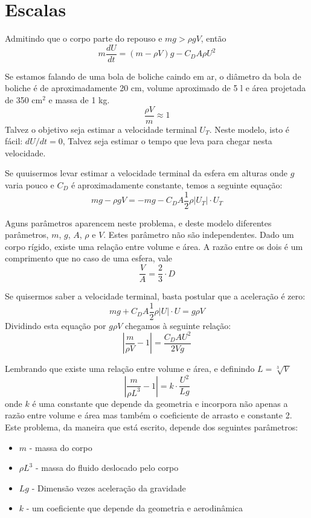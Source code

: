 \section{Escalas}

Admitindo que o corpo parte do repouso e $mg > \rho g V$, então
\[
m \frac{dU}{dt} = (m-\rho V)g - C_D A \rho U^2 
\]

Se estamos falando de uma bola de boliche caindo em ar, o diâmetro da bola de boliche é de aproximadamente 20 cm, volume aproximado de 5 l e área projetada de 350 cm$^2$ e massa de 1 kg. 
\[
\frac{\rho V}{m} \approx 1
\]
Talvez o objetivo seja estimar a velocidade terminal $U_T$. Neste modelo, isto é fácil: $dU/dt = 0$, Talvez seja estimar o tempo que leva para chegar nesta velocidade. 


Se quuisermos levar estimar a velocidade terminal da esfera em alturas onde $g$ varia pouco e $C_D$ é aproximadamente constante, temos a seguinte equação:
\[
mg - \rho g V  = -mg - C_D A \frac{1}{2} \rho |U_T|\cdot U_T
\]

Aguns parâmetros aparencem neste problema, e deste modelo diferentes parâmetros, $m$, $g$, $A$, $\rho$ e  $V$. Estes parâmetro não são independentes. Dado um corpo rígido, existe uma relação entre volume e área. A razão entre os dois é um comprimento que no caso de uma esfera, vale
\[
\frac{V}{A} = \frac{2}{3}\cdot D
\]

Se quisermos saber a velocidade terminal, basta postular que a aceleração é zero:
\[
mg + C_D A \frac{1}{2} \rho |U|\cdot U  = g \rho V
\]
Dividindo esta equação por $g \rho V$ chegamos à seguinte relação:
\[
\left| \frac{m}{\rho V} - 1 \right| = \frac{C_D A U^2}{2 V g}
\]

Lembrando que existe uma relação entre volume e área, e definindo $L = \sqrt[3]{V}$
\[
\left| \frac{m}{\rho L^3} - 1 \right| = k \cdot \frac{U^2}{L g}
\]
onde $k$ é uma constante que depende da geometria e incorpora não apenas a razão entre volume e área mas também o coeficiente de arrasto e constante 2. Este problema, da maneira que está escrito, depende dos seguintes parâmetros:

\begin{itemize}
\item $m$ - massa do corpo
\item $\rho L^3$ - massa do fluido deslocado pelo corpo
\item $Lg$ - Dimensão vezes aceleração da gravidade
\item $k$ - um coeficiente que depende da geometria e aerodinâmica
\end{itemize}

